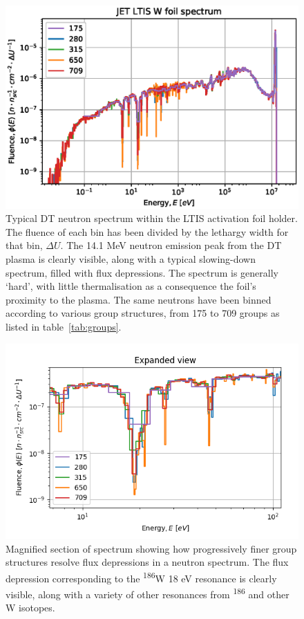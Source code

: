 \begin{figure}[H]
  \centering
  \includegraphics[width=\linewidth]{W186_spectra_diff_groups.eps}
  \caption{Typical DT neutron spectrum within the LTIS activation foil holder. The fluence of each bin has been divided by the lethargy width for that bin, $\Delta U$. The 14.1 MeV neutron emission peak from the DT plasma is clearly visible, along with a typical slowing-down spectrum, filled with flux depressions. The spectrum is generally `hard', with little thermalisation as a consequence the foil's proximity to the plasma. The same neutrons have been binned according to various group structures, from 175 to 709 groups as listed in table~\ref{tab:groups}.}
  \label{fig:spectrum}
\end{figure}

\begin{figure}[H]
  \centering
  \includegraphics[width=\linewidth]{w_spectrum_detail}
  \caption{Magnified section of spectrum showing how progressively finer group structures resolve flux depressions in a neutron spectrum. The flux depression corresponding to the \textsuperscript{186}W 18 eV resonance is clearly visible, along with a variety of other resonances from \textsuperscript{186} and other W isotopes.}
  \label{fig:spectrum_detail}
\end{figure}

